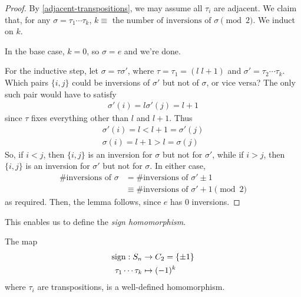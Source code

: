 \documentclass{../template/note}
\begin{document}
    
    
    \begin{proof}
        By \cref{adjacent-transpositions}, we may assume all \(\tau_i\) are adjacent. We claim that, for any \(\sigma = \tau_1 \cdots \tau_k\), \(k \equiv \text{ the number of inversions of } \sigma \pmod 2\). We induct on \(k\).
        
        In the base case, \(k=0\), so \(\sigma = e\) and we're done.
        
        For the inductive step, let \(\sigma = \tau \sigma'\), where \(\tau = \tau_1 = (l \; l+1)\) and \(\sigma' = \tau_2 \cdots \tau_k\). Which pairs \(\{i, j\}\) could be inversions of \(\sigma'\) but not of \(\sigma\), or vice versa? The only such pair would have to satisfy
        \begin{align*}
            \sigma'(i) = l 
            \sigma'(j) = l+1
        \end{align*}
        since \(\tau\) fixes everything other than \(l\) and \(l+1\). Thus
        \begin{align*}
            \sigma'(i) = l < l + 1 = \sigma'(j) \\
            \sigma(i) = l+1 > l = \sigma(j)
        \end{align*}
        So, if \(i < j\), then \(\{i, j\}\) is an inversion for \(\sigma\) but not for \(\sigma'\), while if \(i > j\), then \(\{i, j\}\) is an inversion for \(\sigma'\) but not for \(\sigma\). In either case,
        \begin{align*}
            \#\text{inversions of }\sigma &= \#\text{inversions of }\sigma' \pm 1 \\
            &\equiv \#\text{inversions of }\sigma' + 1 \pmod 2
        \end{align*}
        as required. Then, the lemma follows, since \(e\) has 0 inversions.
    \end{proof}
    
    This enables us to define the \emph{sign homomorphism}.
    
    \begin{theorem}
        The map
        \begin{align*}
            \operatorname{sign}: S_n &\to C_2 = \{\pm 1\} \\
            \tau_1 \cdots \tau_k &\mapsto (-1)^k
        \end{align*}
        where \(\tau_i\) are transpositions, is a well-defined homomorphism.
    \end{theorem}
    
\end{document}
